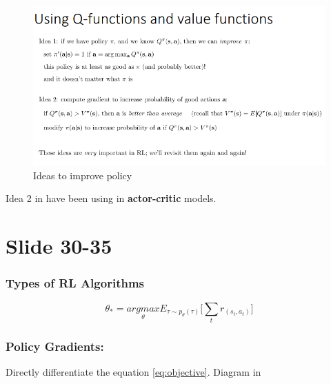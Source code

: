 \documentclass[]{article}
\begin{document}
\begin{figure}
\begin{center}
    \includegraphics[scale=0.5]{cap3img/ideias.png}
\end{center}
\caption{Ideas to improve policy}
\label{fig:ideas}
\end{figure}

\par Idea 2 in  have been using in \textbf{actor-critic} models.


\section*{Slide 30-35}%
\label{sec:Slide 30-35}

\subsubsection*{Types of RL Algorithms}
\label{sub:Types of RL Algorithms}

\begin{equation}
        \label{eq:objective}
        \theta_{*} = \underset{\theta}{argmax}\mathit{E}_{\tau \sim p_{\theta}(\tau)} \Big[ \sum_{t}r_(s_{t},a_{t}) \Big] 
\end{equation}

\subsubsection*{Policy Gradients:}
\label{sub:Policy Gradients:}

\par Directly differentiate the equation \eqref{eq:objective}. Diagram in 
\end{document}
